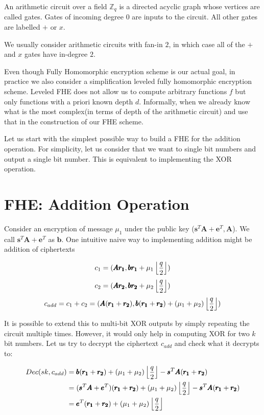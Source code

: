 \documentclass[usletter]{article}
\begin{document}
\begin{definition}
An arithmetic circuit over a field $\mathbb{Z}_q$ is a directed
acyclic graph whose vertices are called gates. Gates of incoming degree $0$ are inputs to
the circuit. All other gates are labelled $+$ or $x$. 
\end{definition}
We usually consider arithmetic circuits with fan-in $2$, in which 
case all of the $+$ and $x$ gates have in-degree $2$.

\begin{remark}
Even though Fully Homomorphic encryption scheme is our actual goal, in practice we also consider 
a simplification leveled fully homomorphic encryption scheme. Leveled FHE does not allow us to 
compute arbitrary functions $f$ but only functions with a priori known depth $d$. Informally, when 
we already know what is the most complex(in terms of depth of the arithmetic circuit) and use that 
in the construction of our FHE scheme.
\end{remark}

Let us start with the simplest possible way to build a FHE for the addition operation. 
For simplicity, let us consider that we want to single bit numbers 
and output a single bit number. This is equivalent to implementing the XOR operation. 

\section{FHE: Addition Operation}

Consider an encryption of message $\mu_1$ under the public key ($\pmb{s}^{T}\pmb{A} + \pmb{e}^{T}, \pmb{A}$). We call 
$\pmb{s}^{T}\pmb{A} + \pmb{e}^{T}$ as $\pmb{b}$. One intuitive naive way to implementing addition might be addition of 
ciphertexts

$$c_1 = ( \pmb{Ar_1}, \pmb{br_1} + \mu_1\left\lfloor \frac{q}{2} \right\rfloor )$$
$$c_2 = ( \pmb{Ar_2}, \pmb{br_2} + \mu_2\left\lfloor \frac{q}{2} \right\rfloor )$$
$$c_{add} = c_1 + c_2 = ( \pmb{A}(\pmb{r_1} + \pmb{r_2}), \pmb{b}(\pmb{r_1} +\pmb{r_2}) + (\mu_1 + \mu_2)\left\lfloor \frac{q}{2} \right\rfloor )$$

It is possible to extend this to multi-bit XOR outputs by simply repeating 
the circuit multiple times. However, it would only help in computing XOR for two $k$ bit numbers. 
Let us try to decrypt the ciphertext $c_{add}$ and check what it decrypts to:

\begin{align*}
Dec(sk,c_{add})
&= \pmb{b}(\pmb{r_1} +\pmb{r_2}) + (\mu_1 + \mu_2)\left\lfloor \frac{q}{2} \right\rfloor-\pmb{s}^T\pmb{A}(\pmb{r_1} + \pmb{r_2})\\
&=(\pmb{s}^{T}\pmb{A} + \pmb{e}^{T})(\pmb{r_1} +\pmb{r_2}) + (\mu_1 + \mu_2)\left\lfloor \frac{q}{2} \right\rfloor-\pmb{s}^T\pmb{A}(\pmb{r_1} + \pmb{r_2})\\
&=\pmb{e}^{T}(\pmb{r_1} +\pmb{r_2}) + (\mu_1 + \mu_2)\left\lfloor \frac{q}{2} \right\rfloor
\end{align*}
\end{document}
